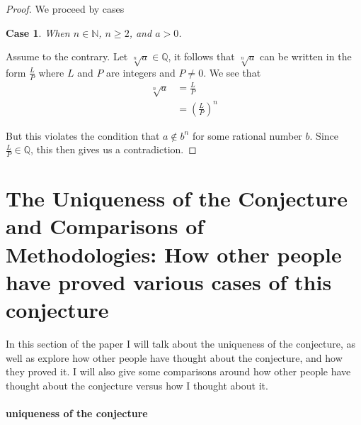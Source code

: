 \documentclass{turabian-researchpaper}
\newtheorem{case}{Case}
\begin{document}
\begin{proof}
    We proceed by cases 
    
    \begin{case}
        When \(n \in \mathds{N}\), \(n \geq 2\), and \(a > 0\).
    \end{case}
    
    Assume to the contrary. Let \(\sqrt[n]{a} \in \mathds{Q}\), it follows that \(\sqrt[n]{a}\) can be written in the form \(\frac{L}{P}\) where \(L\) and \(P\) are integers and \(P \neq 0\). We see that 
    \begin{align*}
        \sqrt[n]{a} &= \frac{L}{P} \\ 
                    &= \left(\frac{L}{P}\right)^n 
    \end{align*} 
    
    But this violates the condition that \(a \notin b^n\) for some rational number $b$. Since \(\frac{L}{P} \in \mathds{Q}\), this then gives us a contradiction. 



\end{proof}

\section{The Uniqueness of the Conjecture and Comparisons of Methodologies: How other people have proved various cases of this conjecture}      

In this section of the paper I will talk about the uniqueness of the conjecture, as well as explore how other people have thought about the conjecture, and how they proved it. I will also give some comparisons around how other people have thought about the conjecture versus how I thought about it. 

\paragraph{uniqueness of the conjecture}
\end{document}
